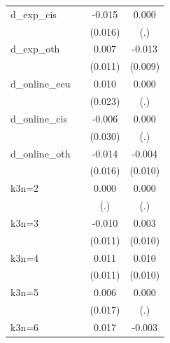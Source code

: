 \begin{table}[htbp]
\begin{tabular}{l*{3}{c}}
\addlinespace
d\_exp\_cis           &                     &      -0.015         &       0.000         \\
                    &                     &     (0.016)         &         (.)         \\
\addlinespace
d\_exp\_oth           &                     &       0.007         &      -0.013         \\
                    &                     &     (0.011)         &     (0.009)         \\
\addlinespace
d\_online\_eeu        &                     &       0.010         &       0.000         \\
                    &                     &     (0.023)         &         (.)         \\
\addlinespace
d\_online\_cis        &                     &      -0.006         &       0.000         \\
                    &                     &     (0.030)         &         (.)         \\
\addlinespace
d\_online\_oth        &                     &      -0.014         &      -0.004         \\
                    &                     &     (0.016)         &     (0.010)         \\
\addlinespace
k3n=2               &                     &       0.000         &       0.000         \\
                    &                     &         (.)         &         (.)         \\
\addlinespace
k3n=3               &                     &      -0.010         &       0.003         \\
                    &                     &     (0.011)         &     (0.010)         \\
\addlinespace
k3n=4               &                     &       0.011         &       0.010         \\
                    &                     &     (0.011)         &     (0.010)         \\
\addlinespace
k3n=5               &                     &       0.006         &       0.000         \\
                    &                     &     (0.017)         &         (.)         \\
\addlinespace
k3n=6               &                     &       0.017         &      -0.003         \\

\end{tabular}
\end{table}
